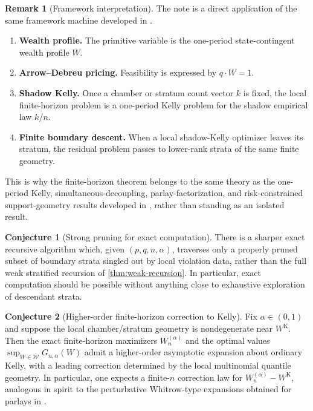 \documentclass[11pt]{article}
\theoremstyle{definition}
\newtheorem{remark}[remark]{Remark}
\newtheorem{conjecture}[conjecture]{Conjecture}
\newcommand{\1}{\mathbf{1}}
\begin{document}
\begin{remark}[Framework interpretation]
The note is a direct application of the same framework machine developed in \cite{Long2026Single,Long2026Simultaneous,Long2026Parlay,Long2026Risk}.
\begin{enumerate}[label=(\roman*), itemsep=2pt]
  \item \textbf{Wealth profile.} The primitive variable is the one-period state-contingent wealth profile $W$.
  \item \textbf{Arrow--Debreu pricing.} Feasibility is expressed by $q\cdot W=1$.
  \item \textbf{Shadow Kelly.} Once a chamber or stratum count vector $k$ is fixed, the local finite-horizon problem is a one-period Kelly problem for the shadow empirical law $k/n$.
  \item \textbf{Finite boundary descent.} When a local shadow-Kelly optimizer leaves its stratum, the residual problem passes to lower-rank strata of the same finite geometry.
\end{enumerate}
This is why the finite-horizon theorem belongs to the same theory as the one-period Kelly, simultaneous-decoupling, parlay-factorization, and risk-constrained support-geometry results developed in \cite{Long2026Single,Long2026Simultaneous,Long2026Parlay,Long2026Risk}, rather than standing as an isolated result.
\end{remark}

\begin{conjecture}[Strong pruning for exact computation]\label{conj:strong-pruning}
There is a sharper exact recursive algorithm which, given $(p,q,n,\alpha)$, traverses only a properly pruned subset of boundary strata singled out by local violation data, rather than the full weak stratified recursion of \cref{thm:weak-recursion}. In particular, exact computation should be possible without anything close to exhaustive exploration of descendant strata.
\end{conjecture}

\begin{conjecture}[Higher-order finite-horizon correction to Kelly]\label{conj:higher-order}
Fix $\alpha\in(0,1)$ and suppose the local chamber/stratum geometry is nondegenerate near $W^{\mathrm K}$. Then the exact finite-horizon maximizers $W_n^{(\alpha)}$ and the optimal values $\sup_{W\in\overline{\mathcal W}} G_{n,\alpha}(W)$ admit a higher-order asymptotic expansion about ordinary Kelly, with a leading correction determined by the local multinomial quantile geometry. In particular, one expects a finite-$n$ correction law for $W_n^{(\alpha)}-W^{\mathrm K}$, analogous in spirit to the perturbative Whitrow-type expansions obtained for parlays in \cite{Long2026Parlay}.
\end{conjecture}
\end{document}
